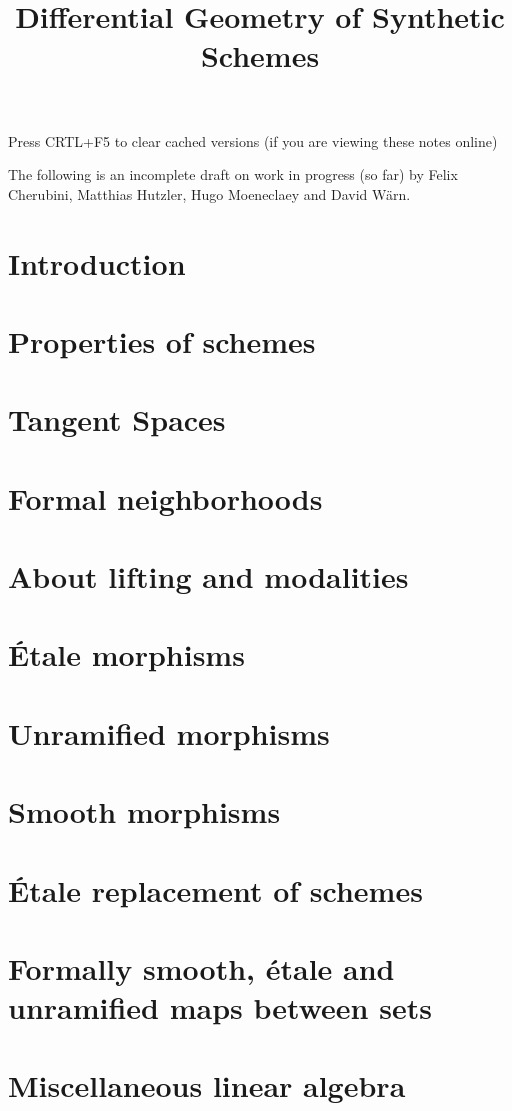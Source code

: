 \documentclass{../util/zariski}
\title{Differential Geometry of Synthetic Schemes}
\begin{document}
\maketitle

\begin{center}
  \color{purple}
  \large{Press CRTL+F5 to clear cached versions}
  \large{(if you are viewing these notes online)}
\end{center}

The following is an incomplete draft on work in progress (so far)
by Felix Cherubini, Matthias Hutzler, Hugo Moeneclaey and David Wärn.

\tableofcontents

\section*{Introduction}


\section{Properties of schemes}


\section{Tangent Spaces}



\section{Formal neighborhoods}


\section{About lifting and modalities}


\section{Étale morphisms}


\section{Unramified morphisms}


\section{Smooth morphisms}


\section{Étale replacement of schemes}


\section{Formally smooth, étale and unramified maps between sets}


\section{Miscellaneous linear algebra}


\printindex

\printbibliography
\end{document}
